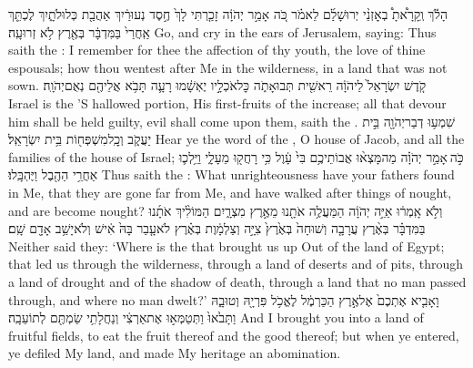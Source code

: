 {הָלֹ֡ךְ וְֽקָרָ֩אתָ֩ בְאׇזְנֵ֨י יְרוּשָׁלַ֜͏ִם לֵאמֹ֗ר כֹּ֚ה אָמַ֣ר יְהֹוָ֔ה זָכַ֤רְתִּי לָךְ֙ חֶ֣סֶד נְעוּרַ֔יִךְ אַהֲבַ֖ת כְּלוּלֹתָ֑יִךְ לֶכְתֵּ֤ךְ אַֽחֲרַי֙ בַּמִּדְבָּ֔ר בְּאֶ֖רֶץ לֹ֥א זְרוּעָֽה׃}
{Go, and cry in the ears of Jerusalem, saying: Thus saith the \lord: I remember for thee the affection of thy youth, the love of thine espousals; how thou wentest after Me in the wilderness, in a land that was not sown.}
{קֹ֤דֶשׁ יִשְׂרָאֵל֙ לַיהֹוָ֔ה רֵאשִׁ֖ית תְּבוּאָתֹ֑ה כׇּל\maqqaf אֹכְלָ֣יו יֶאְשָׁ֔מוּ רָעָ֛ה תָּבֹ֥א אֲלֵיהֶ֖ם נְאֻם\maqqaf יְהֹוָֽה׃ \petucha }
{Israel is the \lord’S hallowed portion, His first-fruits of the increase; all that devour him shall be held guilty, evil shall come upon them, saith the \lord.}
\newperek
{}
\label{haft_43}
\setcounter{chap}{2}
\setcounter{verse}{4}
{שִׁמְע֥וּ דְבַר\maqqaf יְהֹוָ֖ה בֵּ֣ית יַעֲקֹ֑ב וְכׇֽל\maqqaf מִשְׁפְּח֖וֹת בֵּ֥ית יִשְׂרָאֵֽל׃}
{Hear ye the word of the \lord, O house of Jacob, and all the families of the house of Israel;}
{כֹּ֣ה \legarmeh  אָמַ֣ר יְהֹוָ֗ה מַה\maqqaf מָּצְא֨וּ אֲבוֹתֵיכֶ֥ם בִּי֙ עָ֔וֶל כִּ֥י רָחֲק֖וּ מֵעָלָ֑י וַיֵּ֥לְכ֛וּ אַחֲרֵ֥י הַהֶ֖בֶל וַיֶּהְבָּֽלוּ׃}
{Thus saith the \lord: What unrighteousness have your fathers found in Me, that they are gone far from Me, and have walked after things of nought, and are become nought?}
{וְלֹ֣א אָֽמְר֔וּ אַיֵּ֣ה יְהֹוָ֔ה הַמַּעֲלֶ֥ה אֹתָ֖נוּ מֵאֶ֣רֶץ מִצְרָ֑יִם הַמּוֹלִ֨יךְ אֹתָ֜נוּ בַּמִּדְבָּ֗ר בְּאֶ֨רֶץ עֲרָבָ֤ה וְשׁוּחָה֙ בְּאֶ֙רֶץ֙ צִיָּ֣ה וְצַלְמָ֔וֶת בְּאֶ֗רֶץ לֹא\maqqaf עָ֤בַר בָּהּ֙ אִ֔ישׁ וְלֹא\maqqaf יָשַׁ֥ב אָדָ֖ם שָֽׁם׃}
{Neither said they: ‘Where is the \lord\space that brought us up Out of the land of Egypt; that led us through the wilderness, through a land of deserts and of pits, through a land of drought and of the shadow of death, through a land that no man passed through, and where no man dwelt?’}
{וָאָבִ֤יא אֶתְכֶם֙ אֶל\maqqaf אֶ֣רֶץ הַכַּרְמֶ֔ל לֶאֱכֹ֥ל פִּרְיָ֖הּ וְטוּבָ֑הּ וַתָּבֹ֙אוּ֙ וַתְּטַמְּא֣וּ אֶת\maqqaf אַרְצִ֔י וְנַחֲלָתִ֥י שַׂמְתֶּ֖ם לְתוֹעֵבָֽה׃}
{And I brought you into a land of fruitful fields, to eat the fruit thereof and the good thereof; but when ye entered, ye defiled My land, and made My heritage an abomination.}

